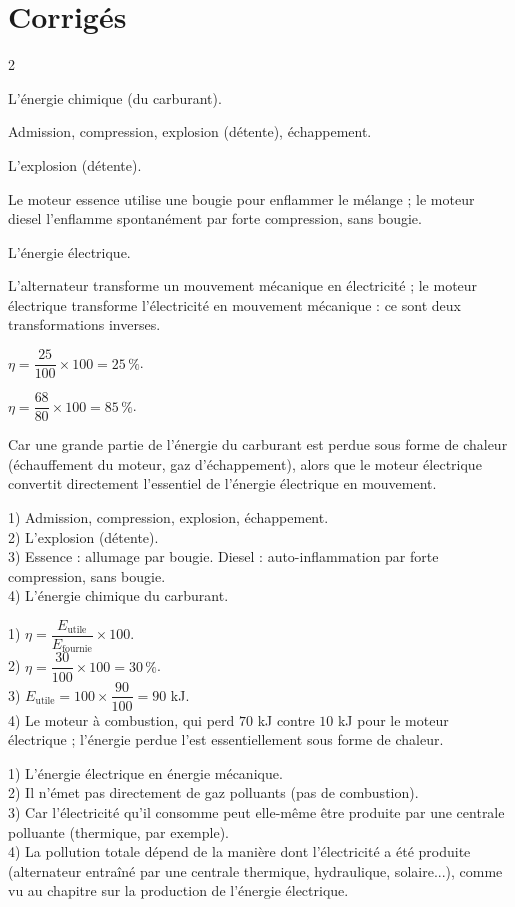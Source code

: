 \section{Corrigés}
\begin{multicols}{2}

L'énergie chimique (du carburant).

Admission, compression, explosion (détente), échappement.

L'explosion (détente).

Le moteur essence utilise une bougie pour enflammer le mélange ; le moteur diesel
l'enflamme spontanément par forte compression, sans bougie.

L'énergie électrique.

L'alternateur transforme un mouvement mécanique en électricité ; le moteur électrique
transforme l'électricité en mouvement mécanique : ce sont deux transformations inverses.

$\eta=\dfrac{25}{100}\times100=25\,\%$.

$\eta=\dfrac{68}{80}\times100=85\,\%$.

Car une grande partie de l'énergie du carburant est perdue sous forme de chaleur
(échauffement du moteur, gaz d'échappement), alors que le moteur électrique convertit
directement l'essentiel de l'énergie électrique en mouvement.

1) Admission, compression, explosion, échappement.\\
2) L'explosion (détente).\\
3) Essence : allumage par bougie. Diesel : auto-inflammation par forte compression, sans
bougie.\\
4) L'énergie chimique du carburant.

1) $\eta=\dfrac{E_{\text{utile}}}{E_{\text{fournie}}}\times100$.\\
2) $\eta=\dfrac{30}{100}\times100=30\,\%$.\\
3) $E_{\text{utile}}=100\times\dfrac{90}{100}=90$ kJ.\\
4) Le moteur à combustion, qui perd $70$ kJ contre $10$ kJ pour le moteur électrique ;
l'énergie perdue l'est essentiellement sous forme de chaleur.

1) L'énergie électrique en énergie mécanique.\\
2) Il n'émet pas directement de gaz polluants (pas de combustion).\\
3) Car l'électricité qu'il consomme peut elle-même être produite par une centrale
polluante (thermique, par exemple).\\
4) La pollution totale dépend de la manière dont l'électricité a été produite
(alternateur entraîné par une centrale thermique, hydraulique, solaire...), comme vu au
chapitre sur la production de l'énergie électrique.

\end{multicols}
\exercicesBanner
